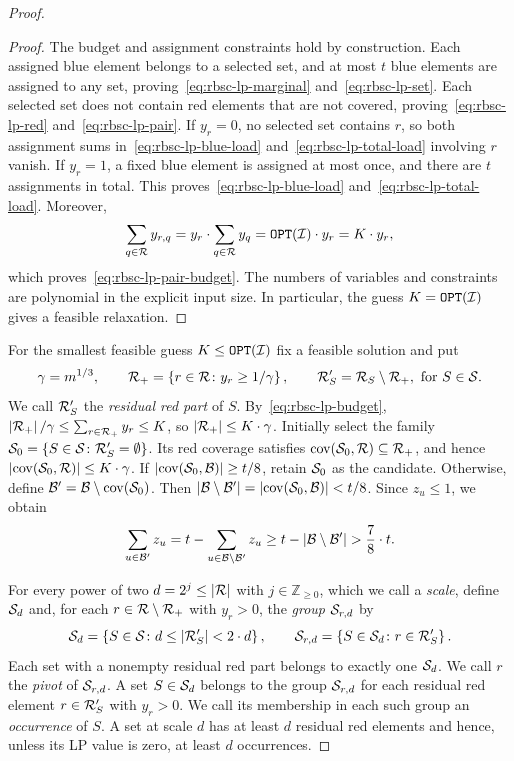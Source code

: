 \begin{proof}
\begin{proof}
The budget and assignment constraints hold by construction. Each assigned blue element belongs to a selected set, and at most $t$ blue elements are assigned to any set, proving~\eqref{eq:rbsc-lp-marginal} and~\eqref{eq:rbsc-lp-set}. Each selected set does not contain red elements that are not covered, proving~\eqref{eq:rbsc-lp-red} and~\eqref{eq:rbsc-lp-pair}. If $y_r=0$, no selected set contains $r$, so both assignment sums in~\eqref{eq:rbsc-lp-blue-load} and~\eqref{eq:rbsc-lp-total-load} involving $r$ vanish. If $y_r=1$, a fixed blue element is assigned at most once, and there are $t$ assignments in total. This proves~\eqref{eq:rbsc-lp-blue-load} and~\eqref{eq:rbsc-lp-total-load}. Moreover,
\[
 \sum_{q\in\mathcal{R}}y_{r,q}=y_r\cdot\sum_{q\in\mathcal{R}}y_q=\texttt{OPT}\mathopen{}\left( \mathcal{I} \right)\cdot y_r=K\cdot y_r,
\]
which proves~\eqref{eq:rbsc-lp-pair-budget}. The numbers of variables and constraints are polynomial in the explicit input size. In particular, the guess $K=\texttt{OPT}\mathopen{}\left( \mathcal{I} \right)$ gives a feasible relaxation.
\end{proof}

For the smallest feasible guess $K\leq \texttt{OPT}\mathopen{}\left( \mathcal{I} \right)$ fix a feasible solution and put
\[
 \gamma=m^{1/3},\qquad \mathcal{R}_+=\mathopen{}\left\{ r\in\mathcal{R}\colon y_r\geq1/\gamma \right\},\qquad \mathcal{R}'_S=\mathcal{R}_S\setminus \mathcal{R}_+, \textup{ for }S\in\mathcal{S}.
\]
We call $\mathcal{R}'_S$ the \emph{residual red part} of $S$. By~\eqref{eq:rbsc-lp-budget}, $\mathopen{}\left| \mathcal{R}_+ \right|/\gamma\leq\sum_{r\in \mathcal{R}_+}y_r\leq K$, so $\mathopen{}\left| \mathcal{R}_+ \right|\leq K\cdot \gamma$. Initially select the family $\mathcal{S}_0=\mathopen{}\left\{ S\in\mathcal{S}\colon \mathcal{R}'_S=\emptyset \right\}$. Its red coverage satisfies $\operatorname{cov}\mathopen{}\left( \mathcal{S}_0,\mathcal{R} \right)\subseteq\mathcal{R}_+$, and hence $\mathopen{}\left| \operatorname{cov}\mathopen{}\left( \mathcal{S}_0,\mathcal{R} \right) \right|\leq K\cdot \gamma$. If $\mathopen{}\left| \operatorname{cov}\mathopen{}\left( \mathcal{S}_0,\mathcal{B} \right) \right|\geq t/8$, retain $\mathcal{S}_0$ as the candidate. Otherwise, define $\mathcal{B}'=\mathcal{B}\setminus\operatorname{cov}\mathopen{}\left( \mathcal{S}_0 \right)$. Then $\mathopen{}\left| \mathcal{B}\setminus\mathcal{B}' \right|=\mathopen{}\left| \operatorname{cov}\mathopen{}\left( \mathcal{S}_0,\mathcal{B} \right) \right|<t/8$. Since $z_u\leq1$, we obtain
\begin{equation}\label{eq:rbsc-residual-mass}
 \sum_{u\in\cB'}z_u
 =t-\sum_{u\in\cB\setminus\cB'}z_u
 \geq t-\spr{\cB\setminus\cB'}>\frac{7}{8}\cdot t.
\end{equation}

For every power of two $d=2^j\leq\mathopen{}\left| \mathcal{R} \right|$ with $j\in\mathbb{Z}_{\geq0}$, which we call a \emph{scale}, define $\mathcal{S}_d$ and, for each $r\in\mathcal{R}\setminus \mathcal{R}_+$ with $y_r>0$, the \emph{group} $\mathcal{S}_{r,d}$ by
\[
 \mathcal{S}_d=\mathopen{}\left\{ S\in\mathcal{S}\colon d\leq\mathopen{}\left| \mathcal{R}'_S \right|<2\cdot d \right\},
 \qquad
 \mathcal{S}_{r,d}=\mathopen{}\left\{ S\in\mathcal{S}_d\colon r\in \mathcal{R}'_S \right\}.
\]
Each set with a nonempty residual red part belongs to exactly one $\mathcal{S}_d$. We call $r$ the \emph{pivot} of $\mathcal{S}_{r,d}$. A set $S\in\mathcal{S}_d$ belongs to the group $\mathcal{S}_{r,d}$ for each residual red element $r\in\mathcal{R}'_S$ with $y_r>0$. We call its membership in each such group an \emph{occurrence} of $S$. A set at scale $d$ has at least $d$ residual red elements and hence, unless its LP value is zero, at least $d$ occurrences.


\end{proof}
